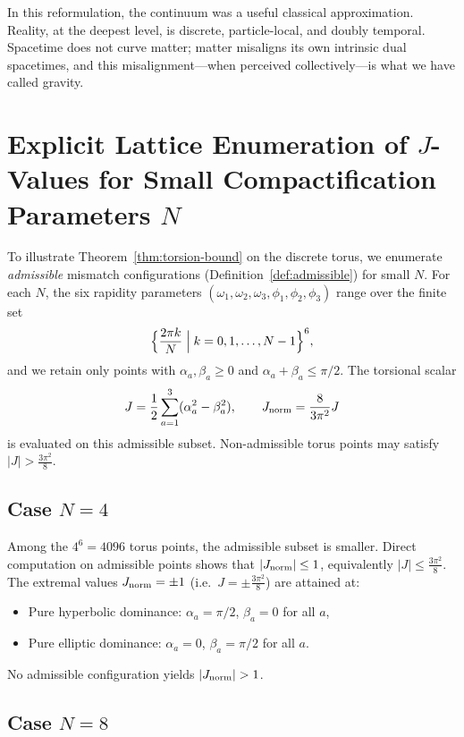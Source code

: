 \documentclass[dvipdfmx,a4paper]{article}
\theoremstyle{definition}
\theoremstyle{remark}
\newcommand{\Jnorm}{J_{\rm norm}}
\newcommand{\Jbound}{\frac{3\pi^2}{8}}
\begin{document}
In this reformulation, the continuum was a useful classical approximation. Reality, at the deepest level, is discrete, particle-local, and doubly temporal. Spacetime does not curve matter; matter misaligns its own intrinsic dual spacetimes, and this misalignment—when perceived collectively—is what we have called gravity.

\appendix

\section{Explicit Lattice Enumeration of \texorpdfstring{\( J \)-Values}{J-Values} for Small Compactification Parameters \texorpdfstring{\( N \)}{N}}

To illustrate Theorem~\ref{thm:torsion-bound} on the discrete torus, we enumerate \emph{admissible} mismatch configurations (Definition~\ref{def:admissible}) for small \( N \). For each \( N \), the six rapidity parameters \( (\omega_1,\omega_2,\omega_3,\phi_1,\phi_2,\phi_3) \) range over the finite set
\[
\Bigl\{ \frac{2\pi k}{N} \Bigm| k = 0,1,\dots,N-1 \Bigr\}^6,
\]
and we retain only points with \(\alpha_a,\beta_a \geq 0\) and \(\alpha_a + \beta_a \leq \pi/2\). The torsional scalar
\[
J = \frac12 \sum_{a=1}^3 (\alpha_a^2 - \beta_a^2), \qquad
\Jnorm = \frac{8}{3\pi^2} J
\]
is evaluated on this admissible subset. Non-admissible torus points may satisfy \(|J| > \Jbound\).

\subsection{Case \texorpdfstring{$N = 4$}{N = 4}}

Among the \( 4^6 = 4096 \) torus points, the admissible subset is smaller. Direct computation on admissible points shows that \(|\Jnorm| \leq 1\), equivalently \(|J| \leq \Jbound\). The extremal values \(\Jnorm = \pm 1\) (i.e.\ \(J = \pm \Jbound\)) are attained at:
\begin{itemize}
  \item Pure hyperbolic dominance: \( \alpha_a = \pi/2 \), \( \beta_a = 0 \) for all \( a \),
  \item Pure elliptic dominance: \( \alpha_a = 0 \), \( \beta_a = \pi/2 \) for all \( a \).
\end{itemize}
No admissible configuration yields \(|\Jnorm| > 1\).

\subsection{Case \texorpdfstring{$N = 8$}{N = 8}}
\end{document}
